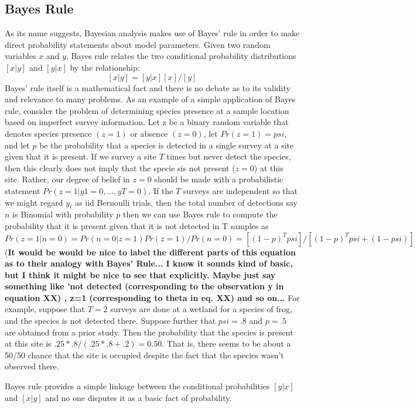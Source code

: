 \subsection{Bayes Rule}

As its name suggests, Bayesian analysis makes use of Bayes' rule in
order to make direct probability statements about model
parameters. Given two random variables $x$ and $y$, Bayes rule relates
the two conditional probability distributions $[x|y]$ and $[y|x]$ by the relationship:
\[
[x|y] = [y|x][x]/[y]
\]
Bayes' rule itself is a mathematical fact and there is no debate as to its validity and relevance to many problems. As an example of a simple application of Bayes rule, consider the problem of determining species presence at a sample location based on imperfect survey information. Let z be a binary random variable that denotes species presence $(z=1)$ or absence $(z=0)$, let $Pr(z=1) = psi$, and let $p$ be the probability that a species is detected in a single survey at a site given that it is present. If we survey a site $T$ times but never detect the species, then this clearly does not imply that the specie sis not present ($z=0$) at this site. Rather, our degree of belief in $z=0$ should be made with a probabilistic statement $Pr(z=1|y1=0,...,yT=0)$. If the $T$ surveys are independent so that we might regard $y_{t}$ as iid Bernoulli trials, then the total number of detections say $n$ is Binomial with probability $p$ then we can use Bayes rule to compute  the probability that it is present given that it is not detected in T samples as
\[
Pr(z=1|n=0) = Pr(n=0|z=1)Pr(z=1)/Pr(n=0) = [(1-p)^{T} psi]/[ (1-p)^T psi + (1-psi) ]
\]
({\bf It would be would be nice to label the different parts of this equation as to their analogy with Bayes' Rule... I know it sounds kind of basic, but I think it might be nice to see that explicitly. Maybe just say something like 'not detected (corresponding to the observation y in equation XX) , z=1 (corresponding to theta in eq. XX) and so on... }
For example, suppose that $T=2$ surveys are done at a wetland for a species of frog, and the species is not detected there. Suppose further that $psi = .8$ and $p = .5$ are obtained from a prior study.  Then the probability that the species is present at this site is  $.25*.8/(.25*.8 + .2) = 0.50$. That is, there seems to be about a 50/50 chance that the site is occupied despite the fact that the species wasn't observed there.

Bayes rule provides a simple linkage between the conditional probabilities $[y|x]$ and $[x|y]$ and no one disputes it as a basic fact of probability. 


